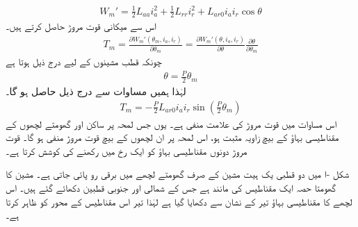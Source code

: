 \begin{align}
W_m'=\frac{1}{2} L_{aa} i_a^2+\frac{1}{2} L_{rr} i_r^2+L_{ar0} i_a i_r \cos \theta
\end{align}
اس سے میکانی قوت مروڑ  حاصل کرتے ہیں۔
\begin{align}\label{مساوات_گھومتے_مشین_مروڑ_بذریعہ_توانائی}
T_m=\frac{\partial W_m'(\theta_m,i_a,i_r)}{\partial \theta_m}=\frac{\partial W_m'(\theta,i_a,i_r)}{\partial \theta} \frac{\partial \theta}{\partial \theta_m}
\end{align}
چونکہ  قطب مشینوں کے لیے درج ذیل ہوتا ہے
\begin{align}
\theta=\frac{P}{2} \theta_m
\end{align}
لہٰذا ہمیں مساوات   سے درج ذیل حاصل ہو گا۔
\begin{align}\label{مساوات_گھومتے_مشین_مروڑ_بذریعہ_کوتوانائی}
T_m=-\frac{P}{2} L_{ar0} i_a i_r \sin \left(\frac{P}{2} \theta_m\right)
\end{align}
اس مساوات میں قوت مروڑ  کی علامت منفی ہے۔ یوں جس لمحہ پر ساکن اور گھومتے لچھوں کے مقناطیسی بہاؤ کے بیچ  زاویہ مثبت ہو، اس لمحہ پر ان لچھوں کے بیچ قوت مروڑ منفی ہو گا۔  قوت مروڑ  دونوں مقناطیسی بہاؤ کو ایک رخ میں رکھنے کی کوشش کرتا ہے۔

شکل -ا  میں دو قطبی یک ہیت مشین کے صرف گھومتے لچھے میں برقی رو پائی  جاتی ہے۔   مشین کا  گھومتا حصہ  ایک مقناطیس کی مانند ہے جس کے شمالی اور جنوبی قطبین دکھائے گئے ہیں۔ اس لچھے کا مقناطیسی بہاؤ تیر کے نشان سے دکھایا گیا ہے لہٰذا  تیر اس مقناطیس کے محور کو ظاہر کرتا ہے۔


